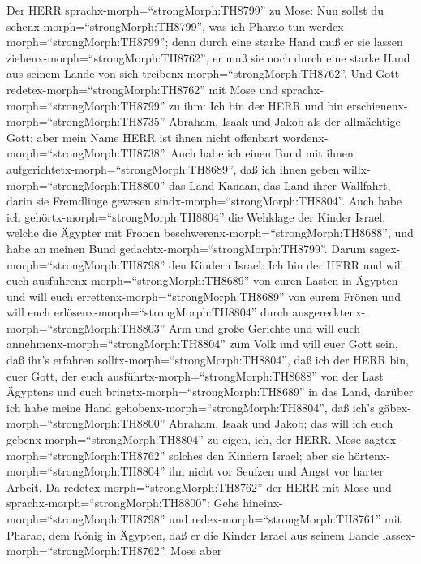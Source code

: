  Der HERR sprachx-morph=``strongMorph:TH8799'' zu Mose: Nun
sollst du sehenx-morph=``strongMorph:TH8799'', was ich Pharao tun
werdex-morph=``strongMorph:TH8799''; denn durch eine starke Hand muß er
sie lassen ziehenx-morph=``strongMorph:TH8762'', er muß sie noch durch
eine starke Hand aus seinem Lande von sich
treibenx-morph=``strongMorph:TH8762''.  Und Gott
redetex-morph=``strongMorph:TH8762'' mit Mose und
sprachx-morph=``strongMorph:TH8799'' zu ihm: Ich bin der HERR
 und bin erschienenx-morph=``strongMorph:TH8735'' Abraham,
Isaak und Jakob als der allmächtige Gott; aber mein Name HERR ist ihnen
nicht offenbart wordenx-morph=``strongMorph:TH8738''.  Auch
habe ich einen Bund mit ihnen
aufgerichtetx-morph=``strongMorph:TH8689'', daß ich ihnen geben
willx-morph=``strongMorph:TH8800'' das Land Kanaan, das Land ihrer
Wallfahrt, darin sie Fremdlinge gewesen
sindx-morph=``strongMorph:TH8804''.  Auch habe ich
gehörtx-morph=``strongMorph:TH8804'' die Wehklage der Kinder Israel,
welche die Ägypter mit Frönen beschwerenx-morph=``strongMorph:TH8688'',
und habe an meinen Bund gedachtx-morph=``strongMorph:TH8799''.
 Darum sagex-morph=``strongMorph:TH8798'' den Kindern
Israel: Ich bin der HERR und will euch
ausführenx-morph=``strongMorph:TH8689'' von euren Lasten in Ägypten und
will euch errettenx-morph=``strongMorph:TH8689'' von eurem Frönen und
will euch erlösenx-morph=``strongMorph:TH8804'' durch
ausgerecktenx-morph=``strongMorph:TH8803'' Arm und große Gerichte
 und will euch annehmenx-morph=``strongMorph:TH8804'' zum
Volk und will euer Gott sein, daß ihr's erfahren
solltx-morph=``strongMorph:TH8804'', daß ich der HERR bin, euer Gott,
der euch ausführtx-morph=``strongMorph:TH8688'' von der Last Ägyptens
 und euch bringtx-morph=``strongMorph:TH8689'' in das Land,
darüber ich habe meine Hand gehobenx-morph=``strongMorph:TH8804'', daß
ich's gäbex-morph=``strongMorph:TH8800'' Abraham, Isaak und Jakob; das
will ich euch gebenx-morph=``strongMorph:TH8804'' zu eigen, ich, der
HERR.  Mose sagtex-morph=``strongMorph:TH8762'' solches den
Kindern Israel; aber sie hörtenx-morph=``strongMorph:TH8804'' ihn nicht
vor Seufzen und Angst vor harter Arbeit.  Da
redetex-morph=``strongMorph:TH8762'' der HERR mit Mose und
sprachx-morph=``strongMorph:TH8800'':  Gehe
hineinx-morph=``strongMorph:TH8798'' und
redex-morph=``strongMorph:TH8761'' mit Pharao, dem König in Ägypten, daß
er die Kinder Israel aus seinem Lande
lassex-morph=``strongMorph:TH8762''.  Mose aber

